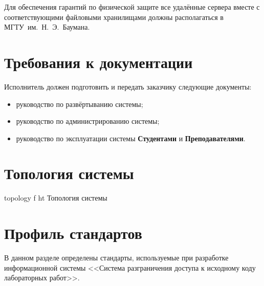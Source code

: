 \documentclass{bmstu}
\begin{document}
  Для обеспечения гарантий по физической защите все удалённые сервера вместе с соответствующими файловыми хранилищами должны располагаться в МГТУ~им.~Н.~Э.~Баумана.

  \section{Требования к документации}

  Исполнитель должен подготовить и передать заказчику следующие
  документы:
  \begin{itemize}[label=---]
    \item руководство по развёртыванию системы;
    \item руководство по администрированию системы;
    \item руководство по эксплуатации системы \textbf{Студентами} и
      \textbf{Преподавателями}.
  \end{itemize}

  \section{Топология системы}

    {topology}
    {f}
    {ht}
    {\textwidth}
    {Топология системы}

  \FloatBarrier
  
  \section{Профиль стандартов}
  
  В данном разделе определены стандарты, используемые при разработке информационной системы <<Система разграничения доступа к исходному коду лабораторных работ>>.
  
\end{document}
